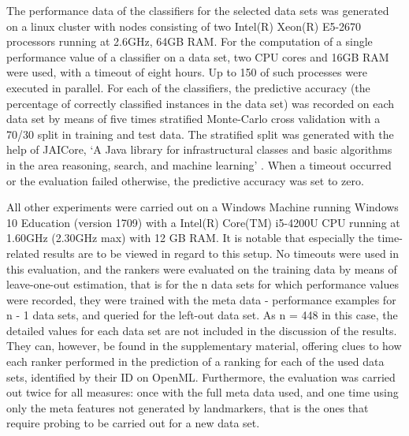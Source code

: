 
The performance data of the classifiers for the selected data sets was generated on a linux cluster with nodes consisting of two Intel(R) Xeon(R) E5-2670 processors running at 2.6GHz, 64GB RAM. For the computation of a single performance value of a classifier on a data set, two CPU cores and 16GB RAM were used, with a timeout of eight hours. Up to 150 of such processes were executed in parallel. For each of the classifiers, the predictive accuracy (the percentage of correctly classified instances in the data set) was recorded on each data set by means of five times stratified Monte-Carlo cross validation with a 70/30 split in training and test data. The stratified split was generated with the help of JAICore, `A Java library for infrastructural classes and basic algorithms in the area reasoning, search, and machine learning' \cite{jaicore}. When a timeout occurred or the evaluation failed otherwise, the predictive accuracy was set to zero.

All other experiments were carried out on a Windows Machine running Windows 10 Education (version 1709) with a Intel(R) Core(TM) i5-4200U CPU running at 1.60GHz (2.30GHz max) with 12 GB RAM. It is notable that especially the time-related results are to be viewed in regard to this setup. No timeouts were used in this evaluation, and the rankers were evaluated on the training data by means of leave-one-out estimation, that is for the n data sets for which performance values were recorded, they were trained with the meta data - performance examples for n - 1 data sets, and queried for the left-out data set. As n = 448 in this case, the detailed values for each data set are not included in the discussion of the results. They can, however, be found in the supplementary material, offering clues to how each ranker performed in the prediction of a ranking for each of the used data sets, identified by their ID on OpenML. Furthermore, the evaluation was carried out twice for all measures: once with the full meta data used, and one time using only the meta features not generated by landmarkers, that is the ones that require probing to be carried out for a new data set.

